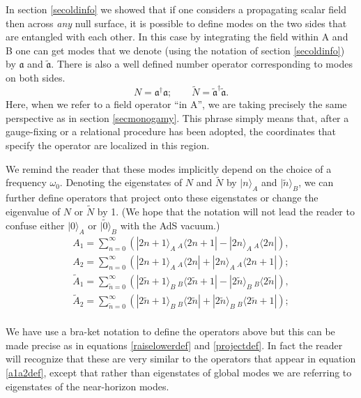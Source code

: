 \documentclass[12pt]{article}
\newcommand{\be}{\begin{equation}}
\newcommand{\ee}{\end{equation}}
\def \anh {\mathfrak{a}}
\def \tildanh {\widetilde{\mathfrak{a}}}
\begin{document}
 In section \ref{secoldinfo} we showed that if one considers a propagating scalar field then across {\em any} null surface, it is possible to define modes on the two sides that are entangled with each other. In this case by integrating the field within A and B one can get modes that we denote (using the notation of section \ref{secoldinfo}) by $\anh$ and $\tildanh$. There is also a well defined number operator corresponding to modes on both sides.
\be
N = \anh^{\dagger} \anh; \qquad \tilde{N} = \tildanh^{\dagger} \tildanh.
\ee
Here, when we refer to a field operator ``in A'', we are taking precisely the same perspective as in section \ref{secmonogamy}. This phrase simply means that, after a gauge-fixing or a relational procedure has been adopted, the coordinates that specify the operator are localized in this region.

We remind the reader that these modes implicitly depend on the choice of a frequency $\omega_0$. Denoting the eigenstates of $N$ and $\widetilde{N}$ by $|n \rangle_{A}$ and $|\tilde{n} \rangle_{B}$,
we can further define operators that project onto these eigenstates or change the eigenvalue of $N$ or $\widetilde{N}$ by 1. (We hope that the notation will not lead the reader to confuse either $|0 \rangle_{A}$ or $|\widetilde{0} \rangle_{B}$ with the AdS vacuum.)
\be
\label{a1a2deftoymodel}
\begin{split}
A_1 = \sum_{n=0}^{\infty} \left( |2 n + 1 \rangle_{A} \, _{A}\langle 2 n + 1| - |2 n \rangle_{A} \, _{A}\langle 2 n| \right), \\
A_2 = \sum_{n=0}^{\infty} \left( |2 n + 1 \rangle_{A} \, _{A}\langle 2 n| +  |2 n \rangle_{A} \, _{A}\langle 2 n + 1| \right); \\
\widetilde{A}_1 = \sum_{\widetilde{n}=0}^{\infty} \left( |2 \widetilde{n} + 1 \rangle_{B} \, _{B}\langle 2 \widetilde{n} + 1| - |2 \widetilde{n} \rangle_{B} \, _{B}\langle 2 \widetilde{n}| \right), \\
\widetilde{A}_2 = \sum_{\widetilde{n}=0}^{\infty} \left( |2 \widetilde{n} + 1 \rangle_{B} \, _{B}\langle 2 \widetilde{n}| +  |2 \widetilde{n} \rangle_{B} \, _{B}\langle 2 \widetilde{n} + 1| \right); \\
\end{split}
\ee

We have use a bra-ket notation to define the operators above but this can be made precise as in equations \eqref{raiselowerdef} and \eqref{projectdef}. In fact the reader will recognize that these are very similar to the operators that appear in equation \eqref{a1a2def},  except that rather than eigenstates of global modes we are referring to eigenstates of the near-horizon modes.
\end{document}
